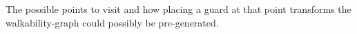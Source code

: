 The possible points to visit and how placing a guard at that point transforms the walkability-graph could possibly be pre-generated.


